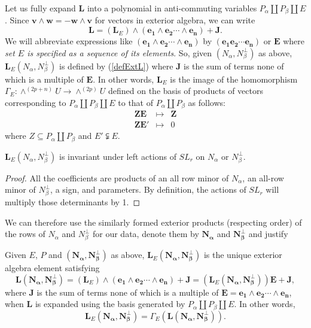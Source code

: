 \documentclass[Unicode]{cedram-alco}
\newcommand{\ext}[1]{\ensuremath{\mathbf{#1}}}
\newcommand{\dunion}{\coprod}
\begin{document}
Let us fully expand $\ext{L}$ into a polynomial in anti-commuting variables
$P_\alpha \dunion P_\beta \dunion E$.  Since $\ext{v}\wedge\ext{w}=-\ext{w}\wedge\ext{v}$ for vectors in
exterior algebra, we can write
\[
\ext{L} = (\ext{L}_E)\wedge (\ext{e_1}\wedge\ext{e_2}\cdots\wedge\ext{e_n}) + \ext{J}.
\]
We will abbreviate expressions like $(\ext{e_1}\wedge\ext{e_2}\cdots\wedge\ext{e_n})$ by
$(\ext{e_1}\ext{e_2}\cdots\ext{e_n})$ or $\ext{E}$ where \emph{set $E$ is specified as a sequence of its elements}.
So, given $(N_\alpha,N_\beta^\perp)$ as above, $\ext{L}_E(N_\alpha,N_\beta^\perp)$ is defined by (\ref{defExtL}) where
$\ext{J}$ is the sum of terms none of which is a multiple of $\ext{E}$.
In other words, $\ext{L}_E$ is the image of the homomorphism
$\Gamma_E:\wedge^{(2p+n)}U\rightarrow\wedge^{(2p)}U$ defined on the basis of
products of vectors corresponding to $P_\alpha \dunion P_\beta \dunion E$ to that
of $P_\alpha \dunion P_\beta$ as follows:
\[
   \begin{array}{ccc}
     \ext{Z}\ext{E} & \longmapsto & \ext{Z} \\
     \ext{Z}\ext{E'} & \longmapsto & 0
   \end{array}
\]
where $Z\subseteq P_\alpha \dunion P_\beta$ and $E'\subsetneqq E$.

\begin{prop}
  $\ext{L}_E(N_\alpha,N_\beta^\perp)$ is invariant under left actions of $SL_r$ on $N_\alpha$ or $N_\beta^\perp$.
\end{prop}
\begin{proof}
  All the coefficients are products of an all row minor of $N_\alpha$, an all-row minor of $N_\beta^\perp$, a sign, and
  parameters.
  By definition, the actions of $SL_r$ will multiply those determinants by 1. 
\end{proof}

We can therefore use the similarly formed exterior products
(respecting order) of the rows of $N_\alpha$ and $N_\beta^\perp$
for our data, denote them by 
$\ext{N_\alpha}$ and $\ext{N_\beta^\perp}$
and justify

\begin{defi}
  Given $E$, $P$ and $(\ext{N_\alpha},\ext{N_\beta^\perp})$ as above, $\ext{L}_E(\ext{N_\alpha},\ext{N_\beta^\perp})$ is the
  unique exterior algebra element satisfying
  \[
  \ext{L}(\ext{N_\alpha},\ext{N_\beta^\perp}) =
  (\ext{L}_E)\wedge (\ext{e_1}\wedge\ext{e_2}\cdots\wedge\ext{e_n}) + \ext{J} =
  (\ext{L}_E(\ext{N_\alpha},\ext{N_\beta^\perp}))\ext{E}+\ext{J},
  \]
where $\ext{J}$ is the sum of terms none of which is a multiple of
$\ext{E}=\ext{e_1}\wedge\ext{e_2}\cdots\wedge\ext{e_n}$, when
$\ext{L}$ is expanded using the basis generated by $P_\alpha \dunion
P_\beta \dunion E$.  In other words,
  \[ 
  \ext{L}_E(\ext{N_\alpha},\ext{N_\beta^\perp}) =\Gamma_E(\ext{L}(\ext{N_\alpha},\ext{N_\beta^\perp})).
  \]
\end{defi}
\end{document}
